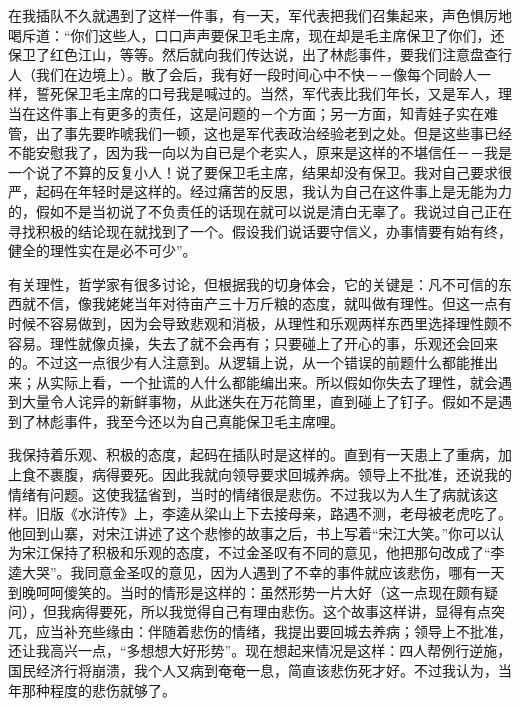 在我插队不久就遇到了这样一件事，有一天，军代表把我们召集起来，声色惧厉地喝斥道：“你们这些人，口口声声要保卫毛主席，现在却是毛主席保卫了你们，还保卫了红色江山，等等。然后就向我们传达说，出了林彪事件，要我们注意盘查行人（我们在边境上）。散了会后，我有好一段时间心中不快－－像每个同龄人一样，誓死保卫毛主席的口号我是喊过的。当然，军代表比我们年长，又是军人，理当在这件事上有更多的责任，这是问题的－个方面；另一方面，知青娃子实在难管，出了事先要昨唬我们一顿，这也是军代表政治经验老到之处。但是这些事已经不能安慰我了，因为我一向以为自已是个老实人，原来是这样的不堪信任－－我是一个说了不算的反复小人！说了要保卫毛主席，结果却没有保卫。我对自己要求很严，起码在年轻时是这样的。经过痛苦的反思，我认为自己在这件事上是无能为力的，假如不是当初说了不负责任的话现在就可以说是清白无辜了。我说过自己正在寻找积极的结论现在就找到了一个。假设我们说话要守信义，办事情要有始有终，健全的理性实在是必不可少”。 

有关理性，哲学家有很多讨论，但根据我的切身体会，它的关键是：凡不可信的东西就不信，像我姥姥当年对待亩产三十万斤粮的态度，就叫做有理性。但这一点有时候不容易做到，因为会导致悲观和消极，从理性和乐观两样东西里选择理性颇不容易。理性就像贞操，失去了就不会再有；只要碰上了开心的事，乐观还会回来的。不过这一点很少有人注意到。从逻辑上说，从一个错误的前题什么都能推出来；从实际上看，一个扯谎的人什么都能编出来。所以假如你失去了理性，就会遇到大量令人诧异的新鲜事物，从此迷失在万花筒里，直到碰上了钉子。假如不是遇到了林彪事件，我至今还以为自己真能保卫毛主席哩。 

我保持着乐观、积极的态度，起码在插队时是这样的。直到有一天患上了重病，加上食不裹腹，病得要死。因此我就向领导要求回城养病。领导上不批准，还说我的情绪有问题。这使我猛省到，当时的情绪很是悲伤。不过我以为人生了病就该这样。旧版《水浒传》上，李逵从梁山上下去接母亲，路遇不测，老母被老虎吃了。他回到山寨，对宋江讲述了这个悲惨的故事之后，书上写着“宋江大笑。”你可以认为宋江保持了积极和乐观的态度，不过金圣叹有不同的意见，他把那句改成了“李逵大哭”。我同意金圣叹的意见，因为人遇到了不幸的事件就应该悲伤，哪有一天到晚呵呵傻笑的。当时的情形是这样的：虽然形势一片大好（这一点现在颇有疑问），但我病得要死，所以我觉得自己有理由悲伤。这个故事这样讲，显得有点突兀，应当补充些缘由：伴随着悲伤的情绪，我提出要回城去养病；领导上不批准，还让我高兴一点，“多想想大好形势”。现在想起来情况是这样：四人帮例行逆施，国民经济行将崩溃，我个人又病到奄奄一息，简直该悲伤死才好。不过我认为，当年那种程度的悲伤就够了。 

